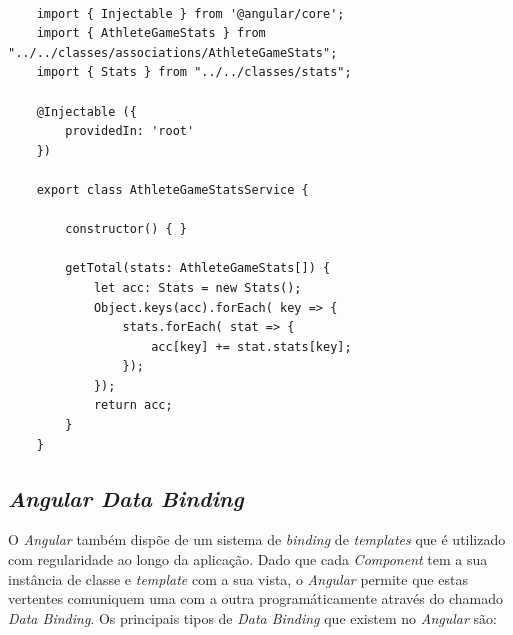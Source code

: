 \begin{lstlisting}

	import { Injectable } from '@angular/core';
	import { AthleteGameStats } from "../../classes/associations/AthleteGameStats";
	import { Stats } from "../../classes/stats";
	
	@Injectable ({
		providedIn: 'root'
	})
	
	export class AthleteGameStatsService {
	
		constructor() { }
	
		getTotal(stats: AthleteGameStats[]) {
			let acc: Stats = new Stats();
			Object.keys(acc).forEach( key => {
				stats.forEach( stat => {
					acc[key] += stat.stats[key];
				});
			});
			return acc;
		}
	}
\end{lstlisting}

\subsection{\textit{Angular Data Binding}}\label{subsec413}

O \textit{Angular} também dispõe de um sistema de \textit{binding} de \textit{templates} que é utilizado com regularidade ao longo da aplicação. Dado que cada \textit{Component} tem a sua instância de classe e \textit{template} com a sua vista, o \textit{Angular} permite que estas vertentes comuniquem uma com a outra programáticamente através do chamado \textit{Data Binding}. 
Os principais tipos de \textit{Data Binding} que existem no \textit{Angular} são: \\

